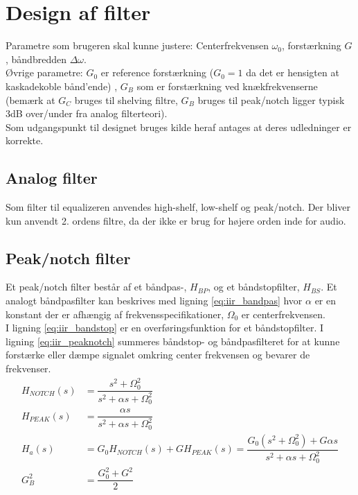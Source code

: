 \section{Design af filter}\label{sec:design_filter}
    Parametre som brugeren skal kunne justere: Centerfrekvensen $\omega_0$,  forstærkning $G$,  båndbredden $\Delta \omega$.\\
    Øvrige parametre:
    $G_0$ er reference forstærkning ($G_0=1$ da det er hensigten at kaskadekoble bånd'ende) , $G_B$ som er forstærkning ved knækfrekvenserne (bemærk at $G_C$ bruges til shelving filtre, $G_B$ bruges til peak/notch ligger typisk 3dB over/under fra analog filterteori).
\\
    Som udgangspunkt til designet bruges kilde \cite{Orfanidis1996} heraf antages at deres udledninger er korrekte.


    \subsection{Analog filter}

	Som filter til equalizeren anvendes high-shelf, low-shelf og  peak/notch.
    Der bliver kun anvendt 2. ordens filtre, da der ikke er brug for højere orden inde for audio.



     \subsection{Peak/notch filter}

    Et peak/notch filter består af et båndpas-, $H_{BP}$, og et båndstopfilter, $H_{BS}$. 
    Et analogt båndpasfilter kan beskrives med ligning \ref{eq:iir_bandpas} 
    hvor $\alpha$ er en konstant der er afhængig af frekvensspecifikationer, $\Omega_0$ er centerfrekvensen.\\
    I ligning \ref{eq:iir_bandstop} er en overføringsfunktion for et båndstopfilter.
    I ligning \ref{eq:iir_peaknotch} summeres båndstop- og båndpasfilteret for at kunne forstærke eller dæmpe signalet omkring center frekvensen og bevarer de frekvenser.    
     \begin{align}
     H_{NOTCH}(s) &= \dfrac{s^2 + \Omega_0^2}{s^2 + \alpha s + \Omega_0^2}
     \label{eq:iir_bandpas} \\
     H_{PEAK} (s) &= \dfrac{\alpha s}{s^2 + \alpha s + \Omega_0^2}  
     \label{eq:iir_bandstop} \\
     H_a (s) &= G_0 H_{NOTCH} (s) + G H_{PEAK} (s) = \dfrac{G_0 (s^2 + \Omega_0^2) + G \alpha s}{s^2 + \alpha s + \Omega_0^2}
     \label{eq:iir_peaknotch}\\
    G_B^2 &= \dfrac{G_0^2 + G^2}{2} \label{eq:iir_gain}
    \end{align}

